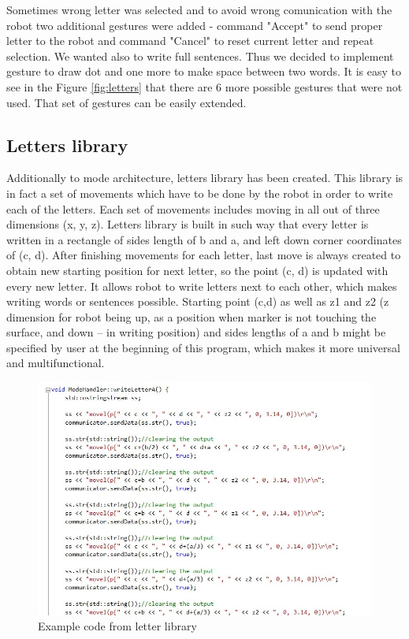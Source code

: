 Sometimes wrong letter was selected and to avoid wrong comunication with the robot two additional gestures were added - command "Accept" to send proper letter to the robot and command "Cancel" to reset current letter and repeat selection. We wanted also to write full sentences. Thus we decided to implement gesture to draw dot and one more to make space between two words. It is easy to see in the Figure \ref{fig:letters} that there are 6 more possible gestures that were not used. That set of gestures can be easily extended. 

\subsection{Letters library}

Additionally to mode architecture, letters library has been created. This library is in fact a set of movements which have to be done by the robot in order to write each of the letters. Each set of movements includes moving in all out of three dimensions (x, y, z). Letters library is built in such way that every letter is written in a rectangle of sides length of b and a, and left down corner coordinates of (c, d). After finishing movements for each letter, last move is always created to obtain new starting position for next letter, so the point (c, d) is updated with every new letter. It allows robot to write letters next to each other, which makes writing words or sentences possible. Starting point (c,d) as well as z1 and z2 (z dimension for robot being up, as a position when marker is not touching the surface, and down – in writing position) and sides lengths of a and b might be specified by user at the beginning of this program, which makes it more universal and multifunctional.\\

\begin{figure}[H]
	\includegraphics[scale=0.8]{Aletter}
	\centering
	\caption{Example code from letter library}
	\label{fig:Aletter}
\end{figure}

